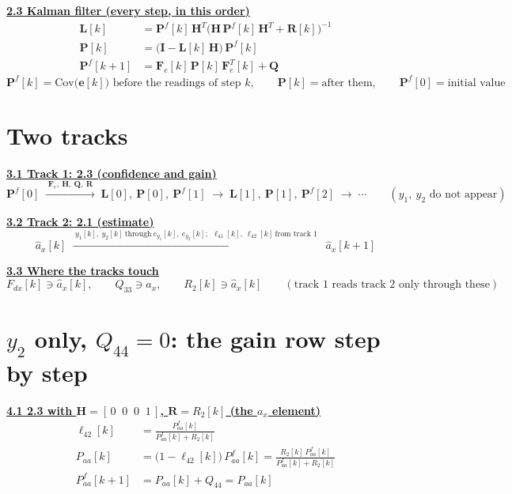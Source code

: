 \documentclass[11pt,a4paper]{ctexart}
\newcommand{\hd}[1]{\par\bigskip\noindent\underline{\textbf{#1}}}
\begin{document}
\hd{2.3 Kalman filter (every step, in this order)}
\[
\begin{aligned}
\mathbf{L}[k] &= \mathbf{P}^f[k]\,\mathbf{H}^T\big(\mathbf{H}\,\mathbf{P}^f[k]\,\mathbf{H}^T + \mathbf{R}[k]\big)^{-1} \\
\mathbf{P}[k] &= \big(\mathbf{I} - \mathbf{L}[k]\,\mathbf{H}\big)\,\mathbf{P}^f[k] \\
\mathbf{P}^f[k+1] &= \mathbf{F}_e[k]\,\mathbf{P}[k]\,\mathbf{F}_e^T[k] + \mathbf{Q}
\end{aligned}
\]
\[
\mathbf{P}^f[k] = \mathrm{Cov}\big(\mathbf{e}[k]\big) \text{ before the readings of step } k, \qquad
\mathbf{P}[k] = \text{after them}, \qquad
\mathbf{P}^f[0] = \text{initial value}
\]

\clearpage
\section{Two tracks}

\hd{3.1 Track 1: 2.3 (confidence and gain)}
\[
\mathbf{P}^f[0] \;\xrightarrow{\;\mathbf{F}_e,\ \mathbf{H},\ \mathbf{Q},\ \mathbf{R}\;}\;
\mathbf{L}[0],\ \mathbf{P}[0],\ \mathbf{P}^f[1] \;\longrightarrow\;
\mathbf{L}[1],\ \mathbf{P}[1],\ \mathbf{P}^f[2] \;\longrightarrow\; \cdots
\qquad (y_1,\ y_2 \text{ do not appear})
\]

\hd{3.2 Track 2: 2.1 (estimate)}
\[
\hat a_x[k] \;\xrightarrow{\;y_1[k],\ y_2[k]\ \text{through}\ e_{y_1}[k],\ e_{y_2}[k];\ \ \ell_{41}[k],\ \ell_{42}[k]\ \text{from track 1}\;}\; \hat a_x[k+1]
\]

\hd{3.3 Where the tracks touch}
\[
F_{dx}[k] \ni \hat a_x[k], \qquad Q_{33} \ni \hat a_x, \qquad R_2[k] \ni \hat a_x[k]
\qquad (\text{track 1 reads track 2 only through these})
\]

\clearpage
\section{$y_2$ only, $Q_{44} = 0$: the gain row step by step}

\hd{4.1 2.3 with $\mathbf{H} = [\,0 \;\; 0 \;\; 0 \;\; 1\,]$, $\mathbf{R} = R_2[k]$ (the $a_x$ element)}
\[
\begin{aligned}
\ell_{42}[k] &= \frac{P^f_{aa}[k]}{P^f_{aa}[k] + R_2[k]} \\
P_{aa}[k] &= \big(1 - \ell_{42}[k]\big)\,P^f_{aa}[k] = \frac{R_2[k]\,P^f_{aa}[k]}{P^f_{aa}[k] + R_2[k]} \\
P^f_{aa}[k+1] &= P_{aa}[k] + Q_{44} = P_{aa}[k]
\end{aligned}
\]
\end{document}
